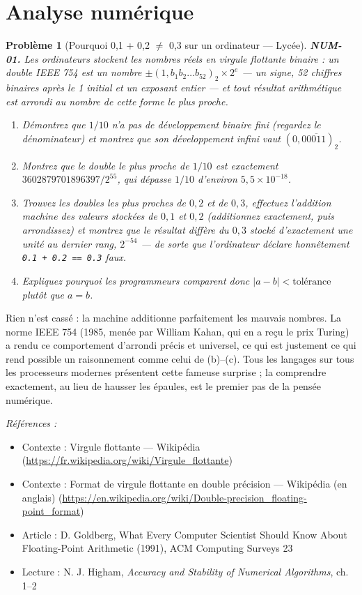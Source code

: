 \documentclass[11pt]{article}
\newtheorem{problem}{Problème}
\newenvironment{refs}{\par\small\noindent\emph{Références :}\begin{itemize}\setlength\itemsep{0pt}}{\end{itemize}\normalsize}
\begin{document}
\bigskip


\section*{Analyse numérique}

\begin{problem}[{Pourquoi 0,1 + 0,2 $\ne$ 0,3 sur un ordinateur --- Lycée}]
\textbf{NUM-01.} Les ordinateurs stockent les nombres réels en virgule
flottante binaire : un \og{} double \fg{} IEEE 754 est un nombre
$\pm(1{,}b_1 b_2 \ldots b_{52})_2 \times 2^{e}$ --- un signe, 52 chiffres binaires après
le 1 initial et un exposant entier --- et tout résultat arithmétique est arrondi au
nombre de cette forme le plus proche.
\begin{enumerate}
\item[(a)] Démontrez que $1/10$ n'a pas de développement binaire fini
(regardez le dénominateur) et montrez que son développement infini vaut
$(0{,}0\overline{0011})_2$.
\item[(b)] Montrez que le double le plus proche de $1/10$ est exactement
$3602879701896397/2^{55}$, qui dépasse $1/10$ d'environ $5{,}5 \times 10^{-18}$.
\item[(c)] Trouvez les doubles les plus proches de $0{,}2$ et de $0{,}3$, effectuez l'addition
machine des valeurs stockées de $0{,}1$ et $0{,}2$ (additionnez exactement, puis
arrondissez) et montrez que le résultat diffère du $0{,}3$ stocké d'exactement une
unité au dernier rang, $2^{-54}$ --- de sorte que l'ordinateur déclare honnêtement
\texttt{0.1 + 0.2 == 0.3} faux.
\item[(d)] Expliquez pourquoi les programmeurs comparent donc
$|a - b| < \text{tolérance}$ plutôt que $a = b$.
\end{enumerate}

\end{problem}

\noindent Rien n'est cassé : la machine additionne parfaitement les mauvais
nombres. La norme IEEE 754 (1985, menée par William Kahan, qui en a reçu le prix
Turing) a rendu ce comportement d'arrondi précis et universel, ce qui est justement
ce qui rend possible un raisonnement comme celui de (b)--(c). Tous les langages sur
tous les processeurs modernes présentent cette fameuse surprise ; la comprendre
exactement, au lieu de hausser les épaules, est le premier pas de la pensée
numérique.

\begin{refs}
\item Contexte : Virgule flottante --- Wikipédia (\url{https://fr.wikipedia.org/wiki/Virgule_flottante})
\item Contexte : Format de virgule flottante en double précision --- Wikipédia (en anglais) (\url{https://en.wikipedia.org/wiki/Double-precision_floating-point_format})
\item Article : D. Goldberg, \og{} What Every Computer Scientist Should Know About Floating-Point Arithmetic \fg{} (1991), ACM Computing Surveys 23
\item Lecture : N. J. Higham, \textit{Accuracy and Stability of Numerical Algorithms}, ch. 1--2
\end{refs}
\end{document}

